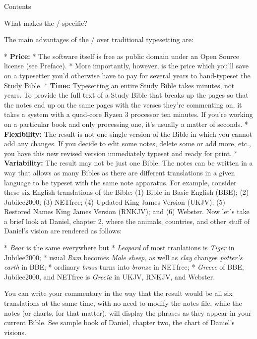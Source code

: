{%



\notoc\nonum\sec Contents
\maketoc
\vfil\break



\sec What makes the \OpBible/ specific?

The main advantages of the \OpBible/ over traditional typesetting are:

\begitems
* {\bf Price:} \begitems
  * The software itself is free as public domain under an Open Source license (see Preface). 
  * More importantly, however, is the price which
  you'll save on a typesetter you'd otherwise have to pay for several years to hand-typeset the Study Bible.
        \enditems
* {\bf Time:} Typesetting an entire Study Bible takes minutes, not years. To provide the full text of a Study Bible  that breaks up the pages so that the notes end up on the same pages with
  the verses they're commenting on, it takes a system with a quad-core Ryzen 3 processor
  ten minutes. If you're working on a particular book and only processing one, it's usually a matter of seconds.
* {\bf Flexibility:} The result is not one single version of the Bible in which you cannot 
add  any changes. If you decide to edit some notes, delete some or add more, etc.,
  you have this new revised version immediately typeset and ready for print.
* {\bf Variability:} The result may not be
  just one Bible. The notes can be written in a way that allows as many Bibles as there are different translations in a given language to be typeset with the same note apparatus. 
  For example, consider these six English translations of the Bible: 
(1)  Bible in Basic English (BBE); (2) Jubilee2000; (3) NETfree; (4) Updated King James Version (UKJV); (5) Restored Names King James Version (RNKJV); and (6) Webster.
Now let's take a brief look at Daniel, chapter 2, where the animals, countries, and other stuff of Daniel's vision are rendered as follows: 

\begitems
* {\it Bear\/} is the same everywhere but
* {\it Leopard\/} of most tranlations is {\it Tiger\/} in Jubilee2000;
* usual {\it Ram\/} becomes {\it Male sheep,\/} as well as {\it clay\/} changes {\it potter's earth\/} in BBE;
* ordinary {\it brass\/} turns into {\it bronze\/} in NETfree;
* {\it Greece\/} of BBE, Jubilee2000, and NETfree is {\it Grecia\/} in UKJV, RNKJV, and Webster.
\enditems

You can write your commentary in the way that the result would be all six translations at the same time, with no need to modify the notes file, while the notes (or charts, for that matter), will display the phrases as they appear in your current Bible. See sample book of Daniel, chapter two, the chart of Daniel's visions.

}
